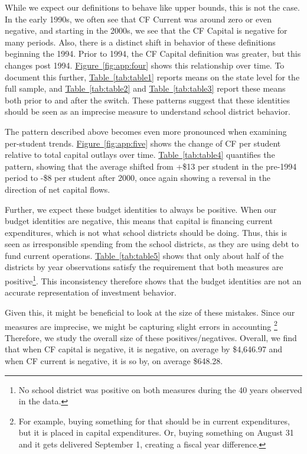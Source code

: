 While we expect our definitions to behave like upper bounds, this is not the case. In the early 1990s, we often see that CF Current was around zero or even negative, and starting in the 2000s, we see that the CF Capital is negative for many periods. Also, there is a distinct shift in behavior of these definitions beginning the 1994. Prior to 1994, the CF Capital definition was greater, but this changes post 1994. \hyperref[fig:app:four]{Figure~\ref*{fig:app:four}} shows this relationship over time. To document this further, \hyperref[tab:table1]{Table~\ref*{tab:table1}} reports means on the state level for the full sample, and \hyperref[tab:table2]{Table~\ref*{tab:table2}} and \hyperref[tab:table3]{Table~\ref*{tab:table3}} report these means both prior to and after the switch. These patterns suggest that these identities should be seen as an imprecise measure to understand school district behavior.


The pattern described above becomes even more pronounced when examining per-student trends. \hyperref[fig:app:five]{Figure~\ref*{fig:app:five}} shows the change of CF per student relative to total capital outlays over time. \hyperref[tab:table4]{Table~\ref*{tab:table4}} quantifies the pattern, showing that the average shifted from +\$13 per student in the pre-1994 period to -\$8 per student after 2000, once again showing a reversal in the direction of net capital flows. 

Further, we expect these budget identities to always be positive. When our budget identities are negative, this means that capital is financing current expenditures, which is not what school districts should be doing. Thus, this is seen as irresponsible spending from the school districts, as they are using debt to fund current operations. \hyperref[tab:table5]{Table~\ref*{tab:table5}} shows that only about half of the districts by year observations satisfy the requirement that both measures are positive\footnote{No school district was positive on both measures during the 40 years observed in the data.}. This inconsistency therefore shows that the budget identities are not an accurate representation of investment behavior.

Given this, it might be beneficial to look at the size of these mistakes. Since our measures are imprecise, we might be capturing slight errors in accounting \footnote{For example, buying something for that should be in current expenditures, but it is placed in capital expenditures. Or, buying something on August 31 and it gets delivered September 1, creating a fiscal year difference.} Therefore, we study the overall size of these positives/negatives. Overall, we find that when CF capital is negative, it is negative, on average by \$4,646.97 and when CF current is negative, it is so by, on average \$648.28. 

